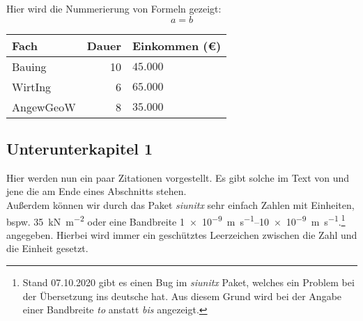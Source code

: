 	Hier wird die Nummerierung von Formeln gezeigt:
	\begin{equation}
		a=b
	\end{equation}
	
	\begin{table}
		\label{tbl:tabularx}
		\centering
		\begin{tabularx}{8cm}{lrX} 
			\toprule
			Fach & Dauer & Einkommen (€)\\ 
			\midrule 
			Bauing & 10 & $45.000$ \\
			WirtIng & 6 & $65.000$ \\
			AngewGeoW & 8 & $35.000$\\ 
			\bottomrule
		\end{tabularx}
	\end{table}


\subsection{Unterunterkapitel 1}
	Hier werden nun ein paar Zitationen vorgestellt. Es gibt solche im Text von \textcite{alam_effects_2014} und jene die am Ende eines Abschnitts stehen. \parencites{bailey_technology_2018}{alam_effects_2014}{dassault_systemes_abaqus_2017}{dassault_systemes_abaqus_2019}
	\\
	\cite{richardson_permeability_1987}
	Außerdem können wir durch das Paket \emph{siunitx} sehr einfach Zahlen mit Einheiten, bspw.	\SI{35}{\kilo\newton\per\square\meter} oder eine Bandbreite \SIrange{1e-9}{10e-9}{\meter\per\second}.\footnote{Stand 07.10.2020 gibt es einen Bug im \emph{siunitx} Paket, welches ein Problem bei der Übersetzung ins deutsche hat. Aus diesem Grund wird bei der Angabe einer Bandbreite \emph{to} anstatt \emph{bis} angezeigt.} angegeben. Hierbei wird immer ein geschütztes Leerzeichen zwischen die Zahl und die Einheit gesetzt.
	
	\blindtext \parencite{alireza_hassanzadegan_thermomechanical_2012}